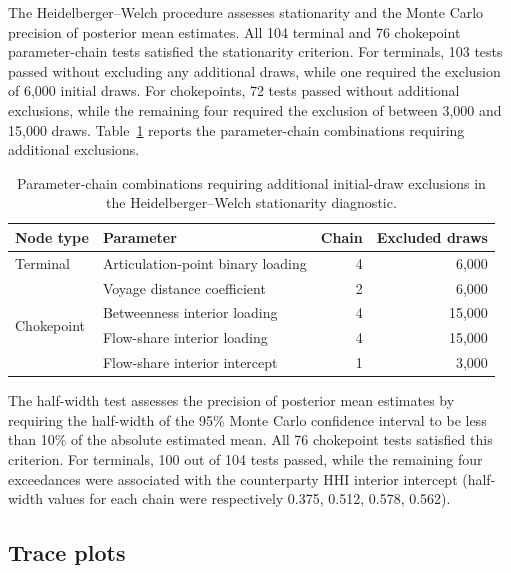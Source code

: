 \documentclass[pdftex,12pt,openright,a4paper,oneside]{book}
\begin{document}
The Heidelberger--Welch procedure assesses
stationarity and the Monte Carlo precision
of posterior mean estimates.
All 104 terminal and 76 chokepoint
parameter-chain tests satisfied the
stationarity criterion.
For terminals, 103 tests passed without
excluding any additional draws, while
one required the exclusion of 6,000
initial draws.
For chokepoints, 72 tests passed without
additional exclusions, while the remaining
four required the exclusion of between
3,000 and 15,000 draws.
Table~\ref{tab:baseline_heidel_stationarity}
reports the parameter-chain combinations
requiring additional exclusions.

\begin{table}[htbp]
\centering
\small
\caption{Parameter-chain combinations requiring
additional initial-draw exclusions in the
Heidelberger--Welch stationarity diagnostic.}
\label{tab:baseline_heidel_stationarity}

\begin{tabular}{llrr}
\toprule
Node type & Parameter & Chain & Excluded draws \\
\midrule

\multirow{1}{*}{Terminal}
& Articulation-point binary loading & 4 & 6,000 \\

\midrule

\multirow{4}{*}{Chokepoint}
& Voyage distance coefficient & 2 & 6,000 \\
& Betweenness interior loading & 4 & 15,000 \\
& Flow-share interior loading & 4 & 15,000 \\
& Flow-share interior intercept & 1 & 3,000 \\

\bottomrule
\end{tabular}

\end{table}

The half-width test assesses the precision
of posterior mean estimates by requiring
the half-width of the 95\% Monte Carlo
confidence interval to be less than 10\%
of the absolute estimated mean.
All 76 chokepoint tests satisfied this
criterion. For terminals, 100 out of 104
tests passed, while the remaining four
exceedances were associated with the
counterparty HHI interior intercept (half-width values for each chain were
respectively 0.375, 0.512, 0.578, 0.562).

\subsection{Trace plots}
\end{document}
